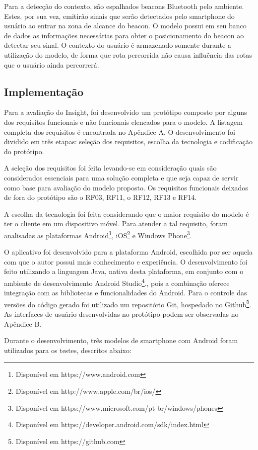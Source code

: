 \documentclass[twoside,english,brazilian]{UNISINOSartigo}
\begin{document}
Para a detecção do contexto, são espalhados beacons Bluetooth pelo ambiente. Estes, por sua vez, emitirão sinais que serão detectados pelo smartphone do usuário ao entrar na zona de alcance do beacon. O modelo possui em seu banco de dados as informações necessárias para obter o posicionamento do beacon ao detectar seu sinal. O contexto do usuário é armazenado somente durante a utilização do modelo, de forma que rota percorrida não causa influência das rotas que o usuário ainda percorrerá.

\subsection{Implementação}
Para a avaliação do Insight, foi desenvolvido um protótipo composto por alguns dos requisitos funcionais e não funcionais elencados para o modelo. A listagem completa dos requisitos é encontrada no Apêndice A. O desenvolvimento foi dividido em três etapas: seleção dos requisitos, escolha da tecnologia e codificação do protótipo.

A seleção dos requisitos foi feita levando-se em consideração quais são considerados essenciais para uma solução completa e que seja capaz de servir como base para avaliação do modelo proposto. Os requisitos funcionais deixados de fora do protótipo são o RF03, RF11, o RF12, RF13 e RF14. 

A escolha da tecnologia foi feita considerando que o maior requisito do modelo é ter o cliente em um dispositivo móvel. Para atender a tal requisito, foram analisadas as plataformas Android\footnote{Disponível em https://www.android.com}, iOS\footnote{Disponível em http://www.apple.com/br/ios/} e Windows Phone\footnote{Disponível em https://www.microsoft.com/pt-br/windows/phones}. 

O aplicativo foi desenvolvido para a plataforma Android, escolhida por ser aquela com que o autor possui mais conhecimento e experiência. O desenvolvimento foi feito utilizando a linguagem Java, nativa desta plataforma, em conjunto com o ambiente de desenvolvimento Android Studio\footnote{Disponível em https://developer.android.com/sdk/index.html}., pois a combinação oferece integração com as bibliotecas e funcionalidades do Android. Para o controle das versões do código gerado foi utilizado um repositório Git, hospedado no Github\footnote{Disponível em https://github.com}.
As interfaces de usuário desenvolvidas no protótipo podem ser observadas no Apêndice B.

Durante o desenvolvimento, três modelos de smartphone com Android foram utilizados para os testes, descritos abaixo:
\end{document}
